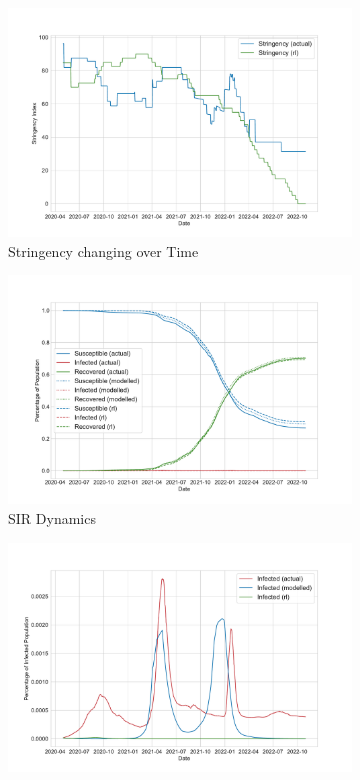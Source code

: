 \documentclass[tikz,fleqn,12pt]{wlscirep}
\begin{document}
\begin{figure}[htbp!]
  \centering
  \begin{subfigure}[t]{0.48\textwidth}
    \centering
    \includegraphics[width=\linewidth]{images/175975/rl_stringency.pdf}
    \caption{Stringency changing over Time}
  \end{subfigure}
  \label{fig:175975_rl_stringency}
  \hfill
  \begin{subfigure}[t]{0.48\textwidth}
    \centering
    \includegraphics[width=\linewidth]{images/175975/rl_sir.pdf}
    \caption{SIR Dynamics}
  \end{subfigure}
  \label{fig:175975_rl_sir}
  \hfill
  \begin{subfigure}[t]{0.48\textwidth}
    \centering
    \includegraphics[width=\linewidth]{images/175975/rl_i.pdf}

\end{subfigure}
\end{figure}
\end{document}

